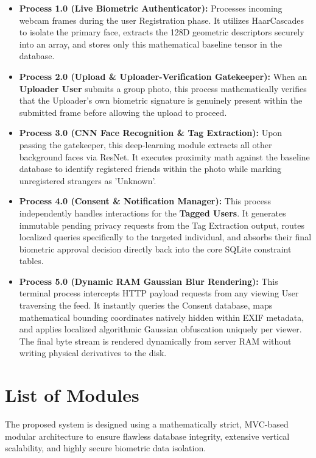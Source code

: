 \begin{itemize}
    \item \textbf{Process 1.0 (Live Biometric Authenticator):} Processes incoming webcam frames during the user Registration phase. It utilizes HaarCascades to isolate the primary face, extracts the 128D geometric descriptors securely into an array, and stores only this mathematical baseline tensor in the database.
    \item \textbf{Process 2.0 (Upload \& Uploader-Verification Gatekeeper):} When an \textbf{Uploader User} submits a group photo, this process mathematically verifies that the Uploader's own biometric signature is genuinely present within the submitted frame before allowing the upload to proceed.
    \item \textbf{Process 3.0 (CNN Face Recognition \& Tag Extraction):} Upon passing the gatekeeper, this deep-learning module extracts all other background faces via ResNet. It executes proximity math against the baseline database to identify registered friends within the photo while marking unregistered strangers as 'Unknown'.
    \item \textbf{Process 4.0 (Consent \& Notification Manager):} This process independently handles interactions for the \textbf{Tagged Users}. It generates immutable pending privacy requests from the Tag Extraction output, routes localized queries specifically to the targeted individual, and absorbs their final biometric approval decision directly back into the core SQLite constraint tables.
    \item \textbf{Process 5.0 (Dynamic RAM Gaussian Blur Rendering):} This terminal process intercepts HTTP payload requests from any viewing User traversing the feed. It instantly queries the Consent database, maps mathematical bounding coordinates natively hidden within EXIF metadata, and applies localized algorithmic Gaussian obfuscation uniquely per viewer. The final byte stream is rendered dynamically from server RAM without writing physical derivatives to the disk.
\end{itemize}

\section{List of Modules}

The proposed system is designed using a mathematically strict, MVC-based modular architecture to ensure flawless database integrity, extensive vertical scalability, and highly secure biometric data isolation. 

